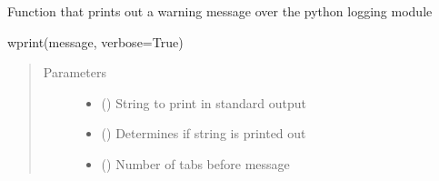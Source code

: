 \documentclass[letterpaper,10pt,english,openany,oneside]{sphinxmanual}
\begin{document}
\begin{fulllineitems}
\label{\detokenize{pygpc:pygpc.io.wprint}}
Function that prints out a warning message over the python logging module

wprint(message, verbose=True)
\begin{quote}\begin{description}
\item[{Parameters}] \leavevmode\begin{itemize}
\item {} 
 () \textendash{} String to print in standard output

\item {} 
 (\sphinxstyleliteralemphasis{\sphinxupquote{, }}\sphinxstyleliteralemphasis{\sphinxupquote{, }}) \textendash{} Determines if string is printed out

\item {} 
 () \textendash{} Number of tabs before message

\end{itemize}

\end{description}\end{quote}

\end{fulllineitems}

\end{document}

